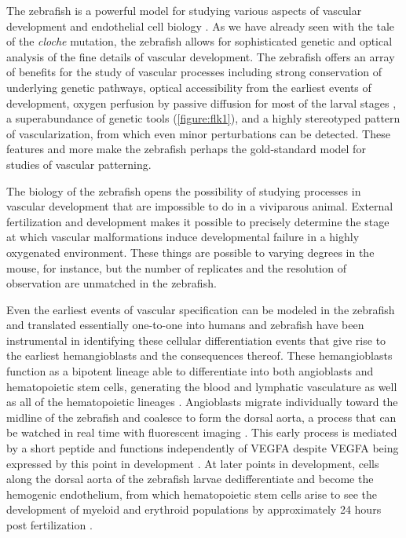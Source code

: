 The zebrafish is a powerful model for studying various aspects of vascular development and endothelial cell biology \citep{Wilkinson2014}. As we have already seen with the tale of the \textit{cloche} mutation, the zebrafish allows for sophisticated genetic and optical analysis of the fine details of vascular development. The zebrafish offers an array of benefits for the study of vascular processes including strong conservation of underlying genetic pathways, optical accessibility from the earliest events of development, oxygen perfusion by passive diffusion for most of the larval stages \citep{Ellertsdottir2010}, a superabundance of genetic tools (\autoref{figure:flk1}), and a highly stereotyped pattern of vascularization, from which even minor perturbations can be detected. These features and more make the zebrafish perhaps the gold\hyp{}standard model for studies of vascular patterning.

The biology of the zebrafish opens the possibility of studying processes in vascular development that are impossible to do in a viviparous animal. External fertilization and development makes it possible to precisely determine the stage at which vascular malformations induce developmental failure in a highly oxygenated environment. These things are possible to varying degrees in the mouse, for instance, but the number of replicates and the resolution of observation are unmatched in the zebrafish. 

Even the earliest events of vascular specification can be modeled in the zebrafish and translated essentially one\hyp{}to\hyp{}one into humans and zebrafish have been instrumental in identifying these cellular differentiation events that give rise to the earliest hemangioblasts and the consequences thereof. These hemangioblasts function as a bipotent lineage able to differentiate into both angioblasts and hematopoietic stem cells, generating the blood and lymphatic vasculature as well as all of the hematopoietic lineages \citep{Vogeli2006}. Angioblasts migrate individually toward the midline of the zebrafish and coalesce to form the dorsal aorta, a process that can be watched in real time with fluorescent imaging \citep{Lawson2002}. This early process is mediated by a short peptide and functions independently of VEGFA despite VEGFA being expressed by this point in development \citep{Nasevicius2000, Liang2001, Hogan2017}. At later points in development, cells along the dorsal aorta of the zebrafish larvae dedifferentiate and become the hemogenic endothelium, from which hematopoietic stem cells arise to see the development of myeloid and erythroid populations by approximately 24 hours post fertilization \citep{Gore2012}. 

